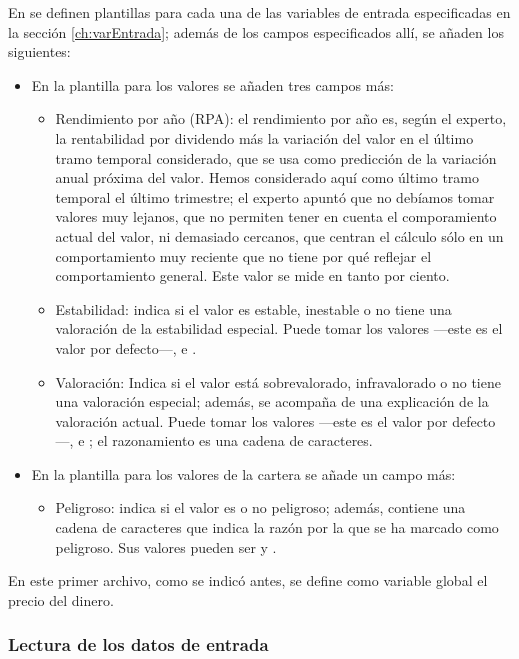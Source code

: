 \documentclass[a4paper, 11pt, titlepage]{article}
\begin{document}
    En  se definen plantillas para cada una de las variables de entrada especificadas en la sección \ref{ch:varEntrada}; además de los campos especificados allí, se añaden los siguientes:
    \begin{itemize}
        \item En la plantilla para los valores se añaden tres campos más:
        \begin{itemize}
            \item Rendimiento por año (RPA): el rendimiento por año es, según el experto, la rentabilidad por dividendo más la variación del valor en el último tramo temporal considerado, que se usa como predicción de la variación anual próxima del valor. Hemos considerado aquí como último tramo temporal el último trimestre; el experto apuntó que no debíamos tomar valores muy lejanos, que no permiten tener en cuenta el comporamiento actual del valor, ni demasiado cercanos, que centran el cálculo sólo en un comportamiento muy reciente que no tiene por qué reflejar el comportamiento general. Este valor se mide en tanto por ciento.
            \item Estabilidad: indica si el valor es estable, inestable o no tiene una valoración de la estabilidad especial. Puede tomar los valores  ---este es el valor por defecto---,  e .
            \item Valoración: Indica si el valor está sobrevalorado, infravalorado o no tiene una valoración especial; además, se acompaña de una explicación de la valoración actual. Puede tomar los valores  ---este es el valor por defecto---,  e ; el razonamiento es una cadena de caracteres.
        \end{itemize}
        \item En la plantilla para los valores de la cartera se añade un campo más:
        \begin{itemize}
            \item Peligroso: indica si el valor es o no peligroso; además, contiene una cadena de caracteres que indica la razón por la que se ha marcado como peligroso. Sus valores pueden ser  y .
        \end{itemize}
    \end{itemize}
    En este primer archivo, como se indicó antes, se define como variable global el precio del dinero.

    \subsubsection*{Lectura de los datos de entrada}
\end{document}
